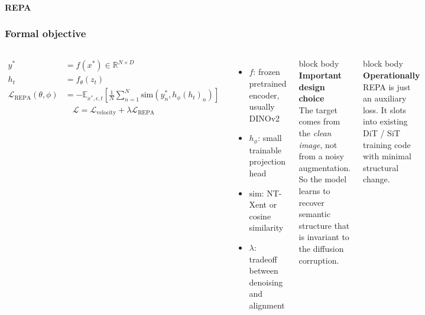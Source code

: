 \begin{frame}[t]
  \framesubtitle{REPA}
  \frametitle{Formal objective}
  \begin{columns}[T,totalwidth=\textwidth]
    \begin{align*}
      y^\ast &= f(x^\ast) \in \mathbb{R}^{N \times D} \\
      h_t &= f_\theta(z_t) \\
      \mathcal{L}_{\text{REPA}}(\theta,\phi) &=
      - \mathbb{E}_{x^\ast,\epsilon,t}
      \left[\frac{1}{N}\sum_{n=1}^N
      \mathrm{sim}\!\left(y_n^\ast, h_\phi(h_t)_n\right)\right]
    \end{align*}
    \begin{align*}
      \mathcal{L} = \mathcal{L}_{\text{velocity}} + \lambda \mathcal{L}_{\text{REPA}}
    \end{align*}
    \vspace{0.12cm}
    \begin{itemize}
      \item \(f\): frozen pretrained encoder, usually DINOv2
      \item \(h_\phi\): small trainable projection head
      \item \(\mathrm{sim}\): NT-Xent or cosine similarity
      \item \(\lambda\): tradeoff between denoising and alignment
    \end{itemize}
    \begin{beamercolorbox}[wd=\linewidth,rounded=true,sep=0.20cm]{block body}
      \textbf{Important design choice}\\
      The target comes from the \emph{clean image}, not from a noisy augmentation.
      So the model learns to recover semantic structure that is invariant to the diffusion corruption.
    \end{beamercolorbox}
    \vspace{0.18cm}
    \begin{beamercolorbox}[wd=\linewidth,rounded=true,sep=0.20cm]{block body}
      \textbf{Operationally}\\
      REPA is just an auxiliary loss. It slots into existing DiT / SiT training code with minimal structural change.
    \end{beamercolorbox}
  \end{columns}
\end{frame}

